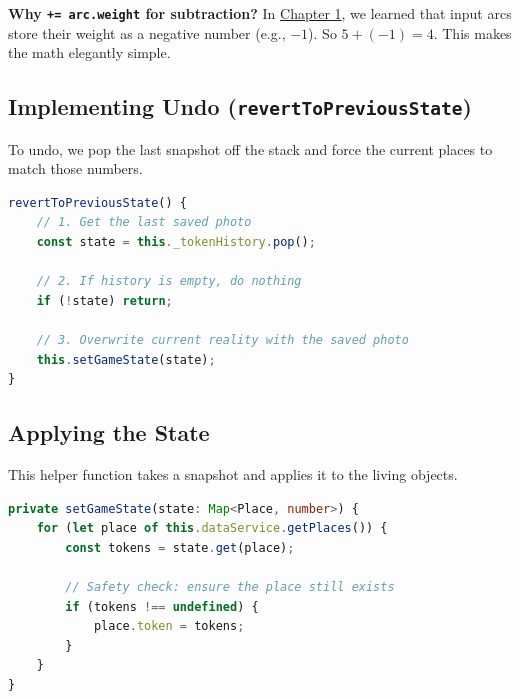 \documentclass[a4paper,11pt,oneside]{report}
\begin{document}
\textbf{Why \texttt{+= arc.weight} for subtraction?}
In \hyperref[chap:primitives]{Chapter 1}, we learned that input arcs store their weight as a negative number (e.g., $-1$). So $5 + (-1) = 4$. This makes the math elegantly simple.

\subsection{Implementing Undo (\texttt{revertToPreviousState})}

To undo, we pop the last snapshot off the stack and force the current places to match those numbers.

\begin{lstlisting}[language=TypeScript]
revertToPreviousState() {
    // 1. Get the last saved photo
    const state = this._tokenHistory.pop();
    
    // 2. If history is empty, do nothing
    if (!state) return;

    // 3. Overwrite current reality with the saved photo
    this.setGameState(state);
}
\end{lstlisting}

\subsection{Applying the State}

This helper function takes a snapshot and applies it to the living objects.

\begin{lstlisting}[language=TypeScript]
private setGameState(state: Map<Place, number>) {
    for (let place of this.dataService.getPlaces()) {
        const tokens = state.get(place);
        
        // Safety check: ensure the place still exists
        if (tokens !== undefined) {
            place.token = tokens;
        }
    }
}
\end{lstlisting}
\end{document}
